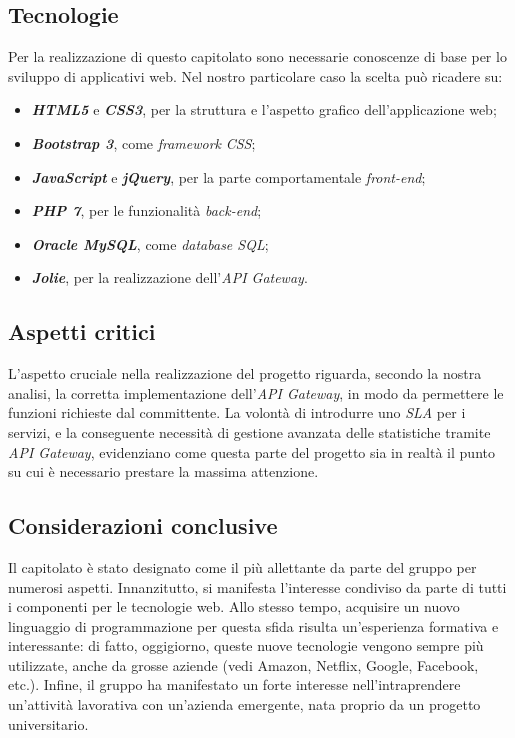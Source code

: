 \subsection{Tecnologie}

Per la realizzazione di questo capitolato sono necessarie conoscenze di base per lo sviluppo di applicativi web. Nel nostro particolare caso la scelta può ricadere su:
\begin{itemize}
	\item \textbf{\textit{HTML5}} e \textbf{\textit{CSS3}}, per la struttura e l'aspetto grafico dell'applicazione web;
	\item \textbf{\textit{Bootstrap 3}}, come \textit{framework} \textit{CSS};
	\item \textbf{\textit{JavaScript}} e \textbf{\textit{jQuery}}, per la parte comportamentale \textit{front-end};
	\item \textbf{\textit{PHP 7}}, per le funzionalità \textit{back-end};
	\item \textbf{\textit{Oracle MySQL}}, come \textit{database SQL};
	\item \textbf{\textit{Jolie}}, per la realizzazione dell'\textit{API Gateway}.
\end{itemize}

\subsection{Aspetti critici}

L'aspetto cruciale nella realizzazione del progetto riguarda, secondo la nostra analisi, la corretta implementazione dell'\textit{API Gateway}, in modo da permettere le funzioni richieste dal committente. La volontà di introdurre uno \textit{SLA} per i servizi, e la conseguente necessità di gestione avanzata delle statistiche tramite \textit{API Gateway}, evidenziano come questa
parte del progetto sia in realtà il punto su cui è necessario prestare la massima attenzione.

\subsection{Considerazioni conclusive}

Il capitolato è stato designato come il più allettante da parte del gruppo per numerosi aspetti. Innanzitutto, si manifesta l'interesse condiviso da parte di tutti i componenti per le tecnologie web. Allo stesso tempo, acquisire un nuovo linguaggio
di programmazione per questa sfida risulta un'esperienza
formativa e interessante: di fatto, oggigiorno, queste nuove tecnologie vengono sempre più utilizzate, anche da grosse aziende (vedi Amazon, Netflix, Google, Facebook, etc.). Infine, il gruppo ha manifestato un forte interesse nell'intraprendere un'attività lavorativa con un'azienda emergente, nata proprio da un progetto universitario.